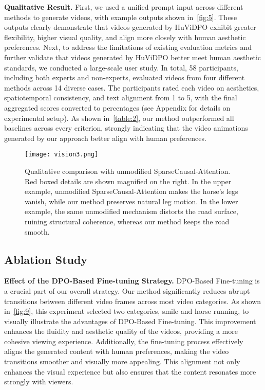 \noindent\textbf{Qualitative Result.} First, we used a unified prompt input across different methods to generate videos, with example outputs shown in~\cref{fig:5}. These outputs clearly demonstrate that videos generated by HuViDPO exhibit greater flexibility, higher visual quality, and align more closely with human aesthetic preferences. Next, to address the limitations of existing evaluation metrics and further validate that videos generated by HuViDPO better meet human aesthetic standards, we conducted a large-scale user study. In total, 58 participants, including both experts and non-experts, evaluated videos from four different methods across 14 diverse cases. The participants rated each video on aesthetics, spatiotemporal consistency, and text alignment from 1 to 5, with the final aggregated scores converted to percentages (see Appendix for details on experimental setup). As shown in~\cref{table:2}, our method outperformed all baselines across every criterion, strongly indicating that the video animations generated by our approach better align with human preferences.


\begin{figure}[!h]
  \centering
  
  \texttt{[image: vision3.png]}
  \caption{Qualitative comparison with unmodified SparseCausal-Attention. Red boxed details are shown magnified on the right. In the upper example, unmodified SparseCausal-Attention makes the horse's legs vanish, while our method preserves natural leg motion. In the lower example, the same unmodified mechanism distorts the road surface, ruining structural coherence, whereas our method keeps the road smooth.}
  \label{fig:8}
\end{figure}


\subsection{Ablation Study}


\noindent\textbf{Effect of the DPO-Based Fine-tuning Strategy.}
DPO-Based Fine-tuning is a crucial part of our overall strategy. Our method significantly reduces abrupt transitions between different video frames across most video categories. As shown in~\cref{fig:9}, this experiment selected two categories, smile and horse running, to visually illustrate the advantages of DPO-Based Fine-tuning. This improvement enhances the fluidity and aesthetic quality of the videos, providing a more cohesive viewing experience. Additionally, the fine-tuning process effectively aligns the generated content with human preferences, making the video transitions smoother and visually more appealing. This alignment not only enhances the visual experience but also ensures that the content resonates more strongly with viewers.


